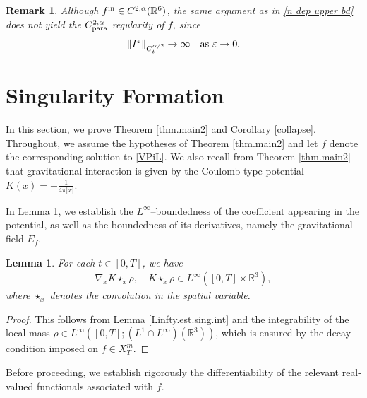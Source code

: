 \documentclass[reqno,11pt,final]{amsart}
\theoremstyle{plain}
\newtheorem{lemma}[theorem]{Lemma}
\newtheorem{remark}[theorem]{Remark}
\numberwithin{equation}{section}
\numberwithin{theorem}{section}
\begin{document}
\begin{remark}
    Although $f^\textup{in}\in C^{2,\alpha}(\mathbb{R}^6)$, the same argument as in \eqref{n dep upper bd} does not yield the $C^{2,\alpha}_{\textup{para}}$ regularity of $f$, since 
$$
\|I^\varepsilon\|_{C^{\alpha/2}_t} \to \infty \quad \textup{as } \varepsilon \to 0 .
$$

\end{remark}


\section{Singularity Formation}
\label{Singularity formation}

In this section, we prove Theorem \ref{thm.main2} and Corollary \ref{collapse}. Throughout, we assume the hypotheses of Theorem \ref{thm.main2} and let $f$ denote the corresponding solution to \eqref{VPiL}. We also recall from Theorem \ref{thm.main2} that gravitational interaction is given by the Coulomb-type potential $K(x) = -\frac{1}{4\pi|x|}$.

In Lemma \ref{basic upper bound}, we establish the $L^\infty$--boundedness of the coefficient appearing in the potential, as well as the boundedness of its derivatives, namely the gravitational field $E_f$.


\begin{lemma}\label{basic upper bound} For each $t\in[0,T]$, we have
\begin{align*}
\nabla_xK\star_x \rho, \quad K\star_x \rho\in L^\infty ([0,T] \times \mathbb{R}^3),
\end{align*}where $\star_x$ denotes the convolution in the spatial variable.
\end{lemma}

\begin{proof}
This follows from Lemma \ref{Linfty.est.sing.int} and the integrability of the local mass $\rho\in L^\infty([0,T]; (L^1\cap L^\infty)(\mathbb{R}^3))$, which is ensured by the decay condition imposed on $f\in X_T^m$.
\end{proof}

Before proceeding, we establish rigorously the differentiability of the relevant real-valued functionals associated with $f$.
\end{document}
